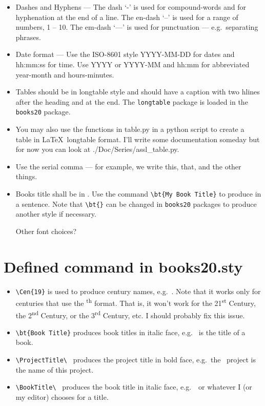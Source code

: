 \documentclass{article}
\begin{document}
\begin{itemize}

\item Dashes and Hyphens --- The dash `-' is used for compound-words and for
  hyphenation at the end of a line.  The en-dash `--' is used for a range
  of numbers, 1 -- 10. The em-dash `---' is used for punctuation ---
  e.g.\ separating phrases.

\item Date format --- Use the ISO-8601\cite{isotime} style
  YYYY-MM-DD for dates and hh:mm:ss for time. Use YYYY or YYYY-MM
  and hh:mm for abbreviated year-month and hours-minutes.

\item Tables should be in longtable style and should have a caption
  with two hlines after the heading and at the end. The
  \texttt{longtable} package is loaded in the \texttt{books20}
  package.

\item You may also use the functions in table.py in a python script to create
  a table in \LaTeX\ longtable format.  I'll write some documentation someday
  but for now you can look at ./Doc/Series/assl\_table.py.

\item Use the serial comma --- for example, we write this, that, and the
  other things.

\item Books title shall be in . Use the command
  \verb|\bt{My Book Title}| to produce  in a
  sentence. Note that \verb|\bt{}| can be changed in \texttt{books20}
  packages to produce another style if necessary.

 Other font choices?

\end{itemize}


\section{Defined command in books20.sty}

\begin{itemize}

\item \verb|\Cen{19}| is used to produce century names,
  e.g.\ . Note that it works only for centuries that use the
  \textsuperscript{th} format.  That is, it won't work for the
  21\textsuperscript{st} Century, the 2\textsuperscript{nd} Century,
  or the 3\textsuperscript{rd} Century, etc. I should probably fix
  this issue.

\item \verb|\bt{Book Title}| produces book titles in italic face,
e.g.\  is the title of a book.

\item \verb|\ProjectTitle\ | produces the project title in bold face,
  e.g.\ the \ProjectTitle\ project is the name of this project.

\item \verb|\BookTitle\ | produces the book title in italic face,
  e.g.\ \BookTitle\ or whatever I (or my editor) chooses for a title.

\end{itemize}
\end{document}
